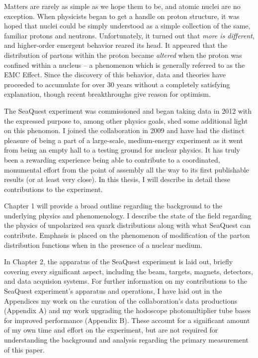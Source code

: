 \documentclass[edeposit,fullpage]{uiucthesis2009}
\begin{document}
Matters are rarely as simple as we hope them to be, and atomic nuclei are no exception. When physicists began to get a handle on proton structure, it was hoped that nuclei could be simply understood as a simple collection of the same, familiar protons and neutrons. Unfortunately, it turned out that \emph{more is different}, and higher-order emergent behavior reared its head. It appeared that the distribution of partons within the proton became \emph{altered} when the proton was confined within a nucleus -- a phenomenon which is generally referred to as the EMC Effect. Since the discovery of this behavior, data and theories have proceeded to accumulate for over 30 years without a completely satisfying explanation, though recent breakthroughs give reason for optimism.

The SeaQuest experiment was commissioned and began taking data in 2012 with the expressed purpose to, among other physics goals, shed some additional light on this phenomon. I joined the collaboration in 2009 and have had the distinct pleasure of being a part of a large-scale, medium-energy experiment as it went from being an empty hall to a testing ground for nuclear physics. It has truly been a rewarding experience being able to contribute to a coordinated, monumental effort from the point of assembly all the way to its first publishable results (or at least very close). In this thesis, I will describe in detail these contributions to the experiment. 

Chapter 1 will provide a broad outline regarding the background to the underlying physics and phenomenology. I describe the state of the field regarding the physics of unpolarized sea quark distributions along with what SeaQuest can contribute. Emphasis is placed on the phenomenon of modification of the parton distribution functions when in the presence of a nuclear medium.

In Chapter 2, the apparatus of the SeaQuest experiment is laid out, briefly covering every significant aspect, including the beam, targets, magnets, detectors, and data acquision systems. For further information on my contributions to the SeaQuest experiment's apparatus and operations, I have laid out in the Appendices my work on the curation of the collaboration's data productions (Appendix A) and my work upgrading the hodoscope photomultiplier tube bases for improved performance (Appendix B). These account for a significant amount of my own time and effort on the experiment, but are not required for understanding the background and analysis regarding the primary measurement of this paper.
\end{document}
